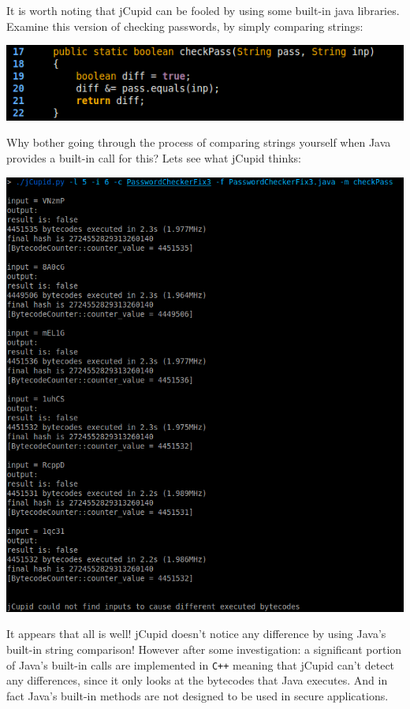 It is worth noting that jCupid can be fooled by using some built-in java libraries. Examine this version
of checking passwords, by simply comparing strings:

\begin{center}
  \includegraphics[width=\linewidth]{PasswordCheckerFix3}
\end{center}

Why bother going through the process of comparing strings yourself when Java provides a built-in call for
this? Lets see what jCupid thinks:

\begin{center}
  \includegraphics[width=\linewidth]{jCupidRun4}
\end{center}

It appears that all is well! jCupid doesn't notice any difference by using Java's built-in string comparison!
However after some investigation: a significant portion of Java's built-in calls are implemented in \texttt{C++}
meaning that jCupid can't detect any differences, since it only looks at the bytecodes that Java executes. And
in fact Java's built-in methods are not designed to be used in secure applications.


